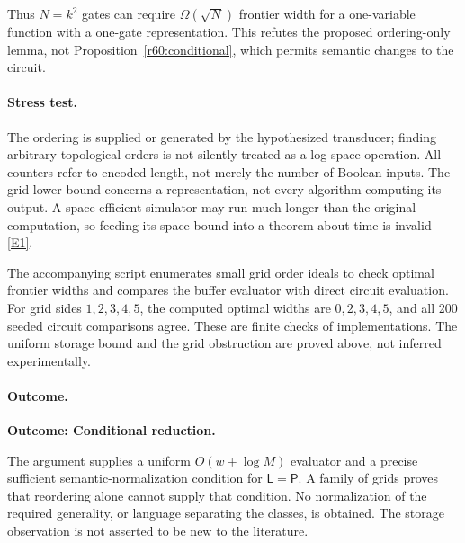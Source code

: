 \documentclass[11pt,a4paper]{article}
\newcommand{\eref}[2]{\hyperlink{extra:#1:#2}{[E#2]}}
\numberwithin{equation}{section}
\begin{document}
Thus $N=k^2$ gates can require $\Omega(\sqrt N)$ frontier width for a one-variable function with a one-gate representation. This refutes the proposed ordering-only lemma, not Proposition~\ref{r60:conditional}, which permits semantic changes to the circuit.

\paragraph{Stress test.}
The ordering is supplied or generated by the hypothesized transducer; finding arbitrary topological orders is not silently treated as a log-space operation. All counters refer to encoded length, not merely the number of Boolean inputs. The grid lower bound concerns a representation, not every algorithm computing its output. A space-efficient simulator may run much longer than the original computation, so feeding its space bound into a theorem about time is invalid \eref{30006702}{1}.

The accompanying script enumerates small grid order ideals to check optimal frontier widths and compares the buffer evaluator with direct circuit evaluation. For grid sides $1,2,3,4,5$, the computed optimal widths are $0,2,3,4,5$, and all 200 seeded circuit comparisons agree. These are finite checks of implementations. The uniform storage bound and the grid obstruction are proved above, not inferred experimentally.

\paragraph{Outcome.}
\textbf{Outcome: Conditional reduction.}

The argument supplies a uniform $O(w+\log M)$ evaluator and a precise sufficient semantic-normalization condition for $\mathsf L=\mathsf P$. A family of grids proves that reordering alone cannot supply that condition. No normalization of the required generality, or language separating the classes, is obtained. The storage observation is not asserted to be new to the literature.

\end{document}
